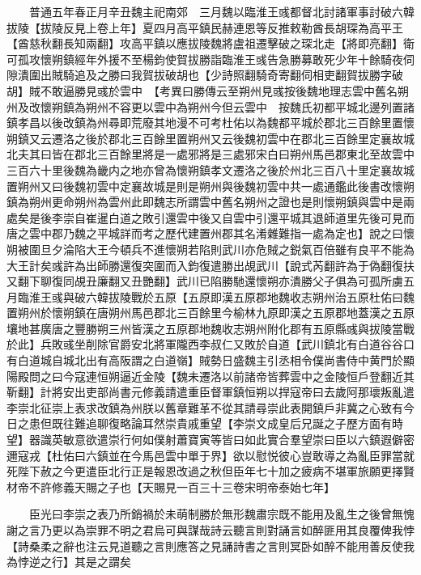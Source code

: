 　　普通五年春正月辛丑魏主祀南郊　三月魏以臨淮王彧都督北討諸軍事討破六韓拔陵【拔陵反見上卷上年】夏四月高平鎮民赫連恩等反推敕勒酋長胡琛為高平王【酋慈秋翻長知兩翻】攻高平鎮以應拔陵魏將盧祖遷擊破之琛北走【將即亮翻】衛可孤攻懷朔鎮經年外援不至楊鈞使賀拔勝詣臨淮王彧告急勝募敢死少年十餘騎夜伺隙潰圍出賊騎追及之勝曰我賀拔破胡也【少詩照翻騎奇寄翻伺相吏翻賀拔勝字破胡】賊不敢逼勝見彧於雲中　【考異曰勝傳云至朔州見彧按後魏地理志雲中舊名朔州及改懷朔鎮為朔州不容更以雲中為朔州今但云雲中　按魏氏初都平城北邊列置諸鎮孝昌以後改鎮為州尋即荒廢其地漫不可考杜佑以為魏都平城於郡北三百餘里置懷朔鎮又云遷洛之後於郡北三百餘里置朔州又云後魏初雲中在郡北三百餘里定襄故城北夫其曰皆在郡北三百餘里將是一處邪將是三處邪宋白曰朔州馬邑郡東北至故雲中三百六十里後魏為畿内之地亦曾為懷朔鎮孝文遷洛之後於州北三百八十里定襄故城置朔州又曰後魏初雲中定襄故城是則是朔州與後魏初雲中共一處通鑑此後書改懷朔鎮為朔州更命朔州為雲州此即魏志所謂雲中舊名朔州之證也是則懷朔鎮與雲中是兩處矣是後李崇自崔暹白道之敗引還雲中後又自雲中引還平城其退師道里先後可見而唐之雲中郡乃魏之平城詳而考之歷代建置州郡其名淆雜難指一處為定也】說之曰懷朔被圍旦夕淪陷大王今頓兵不進懷朔若陷則武川亦危賊之鋭氣百倍雖有良平不能為大王計矣彧許為出師勝還復突圍而入鈞復遣勝出覘武川【說式芮翻許為于偽翻復扶又翻下聊復同覘丑廉翻又丑艷翻】武川已陷勝馳還懷朔亦潰勝父子俱為可孤所虜五月臨淮王彧與破六韓拔陵戰於五原【五原即漢五原郡地魏收志朔州治五原杜佑曰魏置朔州於懷朔鎮在唐朔州馬邑郡北三百餘里今榆林九原即漢之五原郡地蓋漢之五原壤地甚廣唐之豐勝朔三州皆漢之五原郡地魏收志朔州附化郡有五原縣彧與拔陵當戰於此】兵敗彧坐削除官爵安北將軍隴西李叔仁又敗於自道【武川鎮北有白道谷谷口有白道城自城北出有高阪謂之白道嶺】賊勢日盛魏主引丞相令僕尚書侍中黄門於顯陽殿問之曰今寇連恒朔逼近金陵【魏未遷洛以前諸帝皆葬雲中之金陵恒戶登翻近其靳翻】計將安出吏部尚書元修義請遣重臣督軍鎮恒朔以捍寇帝曰去歲阿那瓌叛亂遣李崇北征崇上表求改鎮為州朕以舊章難革不從其請尋崇此表開鎮戶非冀之心致有今日之患但既往難追聊復略論耳然崇貴戚重望【李崇文成皇后兄誕之子歷方面有時望】器識英敏意欲遣崇行何如僕射蕭寶寅等皆曰如此實合羣望崇曰臣以六鎮遐僻密邇寇戎【杜佑曰六鎮並在今馬邑雲中單于界】欲以慰悦彼心豈敢導之為亂臣罪當就死陛下赦之今更遣臣北行正是報恩改過之秋但臣年七十加之疲病不堪軍旅願更擇賢材帝不許修義天賜之子也【天賜見一百三十三卷宋明帝泰始七年】

　　臣光曰李崇之表乃所銷禍於未萌制勝於無形魏肅宗既不能用及亂生之後曾無愧謝之言乃更以為崇罪不明之君烏可與謀哉詩云聽言則對誦言如醉匪用其良覆俾我悖【詩桑柔之辭也注云見道聽之言則應答之見誦詩書之言則冥卧如醉不能用善反使我為悖逆之行】其是之謂矣

